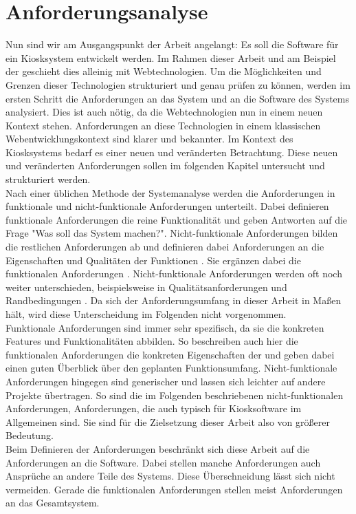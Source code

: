 \chapter{Anforderungsanalyse}
\label{sec:anforderungen}

Nun sind wir am Ausgangspunkt der Arbeit angelangt: Es soll die Software für ein Kiosksystem
entwickelt werden. Im Rahmen dieser Arbeit und am Beispiel der \shst{}
geschieht dies alleinig mit Webtechnologien. Um die Möglichkeiten und Grenzen dieser Technologien
strukturiert und genau prüfen zu können, werden im ersten Schritt die Anforderungen an das System
und an die Software des Systems analysiert.
Dies ist auch nötig, da die Webtechnologien nun in einem neuen Kontext stehen. Anforderungen an diese
Technologien in einem klassischen Webentwicklungskontext sind klarer und bekannter. Im Kontext
des Kiosksystems bedarf es einer neuen und veränderten Betrachtung. 
Diese neuen und veränderten Anforderungen sollen im folgenden Kapitel untersucht und strukturiert
werden.\\

Nach einer üblichen Methode der Systemanalyse werden die Anforderungen in funktionale und 
nicht-funktionale Anforderungen unterteilt. Dabei definieren funktionale Anforderungen die 
reine Funktionalität und geben Antworten 
auf die Frage "Was soll das System machen?". Nicht-funktionale Anforderungen bilden die
restlichen Anforderungen ab und definieren dabei Anforderungen an die Eigenschaften und Qualitäten der
Funktionen \cite[S.20 f.]{systemanalyse}. Sie ergänzen dabei die funktionalen 
Anforderungen \cite{systematisches}. Nicht-funktionale Anforderungen werden oft noch weiter unterschieden,
beispielsweise in Qualitätsanforderungen und Randbedingungen \cite{systemanalyse,systematisches}.
Da sich der Anforderungsumfang in dieser Arbeit in Maßen hält, wird diese Unterscheidung im Folgenden
nicht vorgenommen.\\
Funktionale Anforderungen sind immer sehr spezifisch, da sie die konkreten Features
und Funktionalitäten abbilden. So beschreiben auch hier die funktionalen Anforderungen die konkreten
Eigenschaften der \shst{} und geben dabei einen guten Überblick über den geplanten Funktionsumfang.
Nicht-funktionale Anforderungen hingegen sind generischer und lassen sich leichter auf andere Projekte
übertragen. So sind die im Folgenden beschriebenen nicht-funktionalen Anforderungen, Anforderungen, die
auch typisch für Kiosksoftware im Allgemeinen sind. Sie sind für die Zielsetzung dieser Arbeit also von 
größerer Bedeutung.\\
Beim Definieren der Anforderungen beschränkt sich diese Arbeit auf die Anforderungen an die Software.
Dabei stellen manche Anforderungen auch Ansprüche an andere Teile des Systems. Diese Überschneidung
lässt sich nicht vermeiden. Gerade die funktionalen Anforderungen stellen meist Anforderungen an das 
Gesamtsystem.\\ 


